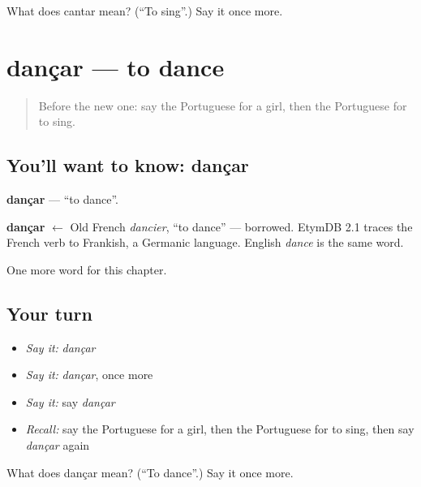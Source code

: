 \begin{tcolorbox}[breakable,colback=teal!4,colframe=teal!35!black,title={Before you move on}]
What does cantar mean? (\textquotedblleft{}To sing\textquotedblright{}.) Say it once more.
\end{tcolorbox}
\section[dançar]{dançar — to dance}

\label{lesson:PT-C40-dancar}



\begin{quote}
Before the new one: say the Portuguese for a girl, then the Portuguese for to sing.
\end{quote}

\subsection*{You'll want to know: dançar}
\textbf{dançar} — \textquotedblleft{}to dance\textquotedblright{}.

\begin{cousinweb}
\textbf{dançar} $\leftarrow$ Old French \emph{dancier}, \textquotedblleft{}to dance\textquotedblright{} — borrowed. EtymDB 2.1 traces the French verb to Frankish, a Germanic language. English \emph{dance} is the same word.
\end{cousinweb}

\begin{grammarlens}[title={What you've built}]
One more word for this chapter.
\end{grammarlens}

\subsection*{Your turn}
\begin{itemize}
\raggedright
  \item \emph{Say it:} \emph{dançar}
  \item \emph{Say it:} \emph{dançar}, once more
  \item \emph{Say it:} say \emph{dançar}
  \item \emph{Recall:} say the Portuguese for a girl, then the Portuguese for to sing, then say \emph{dançar} again
\end{itemize}

\begin{tcolorbox}[breakable,colback=teal!4,colframe=teal!35!black,title={Before you move on}]
What does dançar mean? (\textquotedblleft{}To dance\textquotedblright{}.) Say it once more.
\end{tcolorbox}
